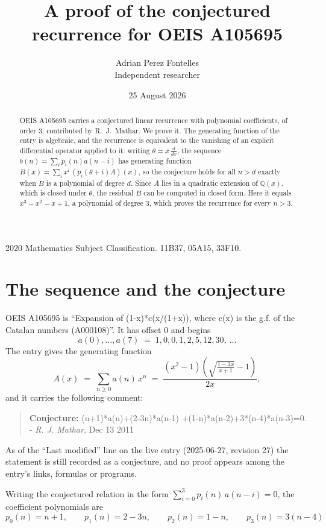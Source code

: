\documentclass[11pt,a4paper]{article}
\title{A proof of the conjectured recurrence for OEIS A105695}
\author{Adrian Perez Fontelles\\ \small Independent researcher}
\date{25 August 2026}
\theoremstyle{plain}
\theoremstyle{definition}
\begin{document}
\maketitle

\begin{abstract}
OEIS A105695 carries a conjectured linear recurrence with polynomial coefficients, of
order 3, contributed by R.~J.~Mathar. We prove it. The generating function of the
entry is algebraic, and the recurrence is equivalent to the vanishing of an explicit
differential operator applied to it: writing $\theta=x\,\frac{d}{dx}$, the sequence
$b(n)=\sum_{i}p_{i}(n)a(n-i)$ has generating function
$B(x)=\sum_{i}x^{i}\,(p_{i}(\theta+i)A)(x)$, so the conjecture holds for all $n>d$ exactly
when $B$ is a polynomial of degree $d$. Since $A$ lies in a quadratic extension of
$\mathbb{Q}(x)$, which is closed under $\theta$, the residual $B$ can be computed in
closed form. Here it equals $x^{3} - x^{2} - x + 1$, a polynomial of degree $3$, which proves
the recurrence for every $n>3$.
\end{abstract}

\noindent\small 2020 Mathematics Subject Classification. 11B37, 05A15, 33F10.\normalsize

\section{The sequence and the conjecture}

OEIS A105695 is ``Expansion of (1-x)*c(x/(1+x)), where c(x) is the g.f. of the Catalan numbers (A000108)''. It has offset $0$ and begins
\[
a(0),\dots,a(7)\;=\;1, 0, 0, 1, 2, 5, 12, 30,\ \dots
\]
The entry gives the generating function
\begin{equation}\label{eq:gf}
A(x)\;=\;\sum_{n\ge 0} a(n)\,x^{n}\;=\;\frac{\left(x^{2} - 1\right) \left(\sqrt{\frac{1 - 3 x}{x + 1}} - 1\right)}{2 x} ,
\end{equation}
and it carries the following comment:
\begin{quote}\small
\textbf{Conjecture:} (n+1)*a(n)+(2-3n)*a(n-1) +(1-n)*a(n-2)+3*(n-4)*a(n-3)=0. - \emph{R. J. Mathar}, Dec 13 2011
\end{quote}
As of the ``Last modified'' line on the live entry (2025-06-27, revision 27) the
statement is still recorded as a conjecture, and no proof appears among the entry's links,
formulas or programs.

Writing the conjectured relation in the form $\sum_{i=0}^{3}p_{i}(n)\,a(n-i)=0$,
the coefficient polynomials are
\[
p_{0}(n)=n + 1,\qquad p_{1}(n)=2 - 3 n,\qquad p_{2}(n)=1 - n,\qquad p_{3}(n)=3 \left(n - 4\right)
\]
\end{document}
